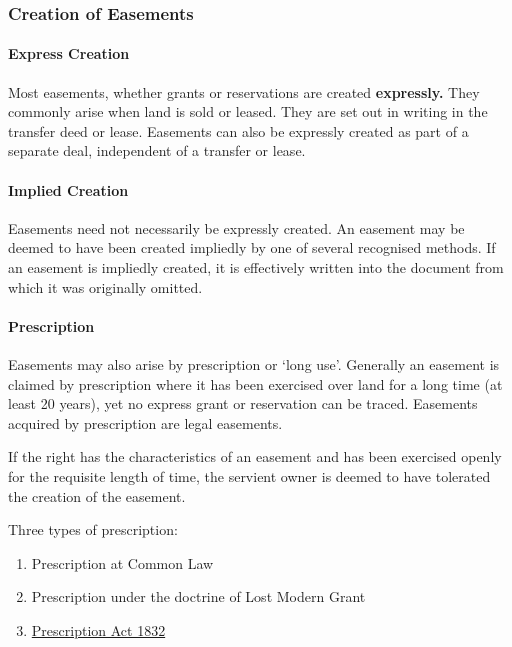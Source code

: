 \documentclass[
]{article}
\providecommand{\tightlist}{%
  \setlength{\itemsep}{0pt}\setlength{\parskip}{0pt}}
\begin{document}
\hypertarget{creation-of-easements}{%
\subsubsection{Creation of Easements}\label{creation-of-easements}}

\hypertarget{express-creation}{%
\paragraph{Express Creation}\label{express-creation}}

Most easements, whether grants or reservations are created
\textbf{expressly.} They commonly arise when land is sold or leased.
They are set out in writing in the transfer deed or lease. Easements can
also be expressly created as part of a separate deal, independent of a
transfer or lease.

\hypertarget{implied-creation}{%
\paragraph{Implied Creation}\label{implied-creation}}

Easements need not necessarily be expressly created. An easement may be
deemed to have been created impliedly by one of several recognised
methods. If an easement is impliedly created, it is effectively written
into the document from which it was originally omitted.

\hypertarget{prescription}{%
\paragraph{Prescription}\label{prescription}}

Easements may also arise by prescription or `long use'. Generally an
easement is claimed by prescription where it has been exercised over
land for a long time (at least 20 years), yet no express grant or
reservation can be traced. Easements acquired by prescription are legal
easements.

If the right has the characteristics of an easement and has been
exercised openly for the requisite length of time, the servient owner is
deemed to have tolerated the creation of the easement.

Three types of prescription:

\begin{enumerate}
\tightlist
\item
  Prescription at Common Law
\item
  Prescription under the doctrine of Lost Modern Grant
\item
  \href{https://www.legislation.gov.uk/ukpga/Will4/2-3/71/contents}{Prescription
  Act 1832}
\end{enumerate}
\end{document}
